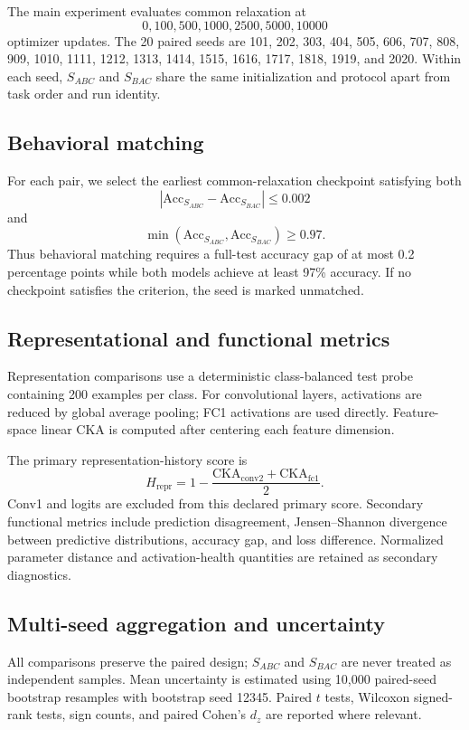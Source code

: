 \documentclass[11pt,a4paper]{article}
\newcommand{\hrepr}{H_{\mathrm{repr}}}
\newcommand{\sabc}{S_{ABC}}
\newcommand{\sbac}{S_{BAC}}
\begin{document}
The main experiment evaluates common relaxation at
\[
0,100,500,1000,2500,5000,10000
\]
optimizer updates. The 20 paired seeds are 101, 202, 303, 404, 505, 606, 707, 808, 909, 1010, 1111, 1212, 1313, 1414, 1515, 1616, 1717, 1818, 1919, and 2020. Within each seed, $\sabc$ and $\sbac$ share the same initialization and protocol apart from task order and run identity.

\subsection{Behavioral matching}
For each pair, we select the earliest common-relaxation checkpoint satisfying both
\[
|\mathrm{Acc}_{\sabc}-\mathrm{Acc}_{\sbac}|\leq0.002
\]
and
\[
\min(\mathrm{Acc}_{\sabc},\mathrm{Acc}_{\sbac})\geq0.97.
\]
Thus behavioral matching requires a full-test accuracy gap of at most 0.2 percentage points while both models achieve at least 97\% accuracy. If no checkpoint satisfies the criterion, the seed is marked unmatched.

\subsection{Representational and functional metrics}
Representation comparisons use a deterministic class-balanced test probe containing 200 examples per class. For convolutional layers, activations are reduced by global average pooling; FC1 activations are used directly. Feature-space linear CKA is computed after centering each feature dimension.

The primary representation-history score is
\[
\hrepr = 1-\frac{\mathrm{CKA}_{\mathrm{conv2}}+\mathrm{CKA}_{\mathrm{fc1}}}{2}.
\]
Conv1 and logits are excluded from this declared primary score. Secondary functional metrics include prediction disagreement, Jensen--Shannon divergence between predictive distributions, accuracy gap, and loss difference. Normalized parameter distance and activation-health quantities are retained as secondary diagnostics.

\subsection{Multi-seed aggregation and uncertainty}
All comparisons preserve the paired design; $\sabc$ and $\sbac$ are never treated as independent samples. Mean uncertainty is estimated using 10,000 paired-seed bootstrap resamples with bootstrap seed 12345. Paired $t$ tests, Wilcoxon signed-rank tests, sign counts, and paired Cohen's $d_z$ are reported where relevant.
\end{document}
